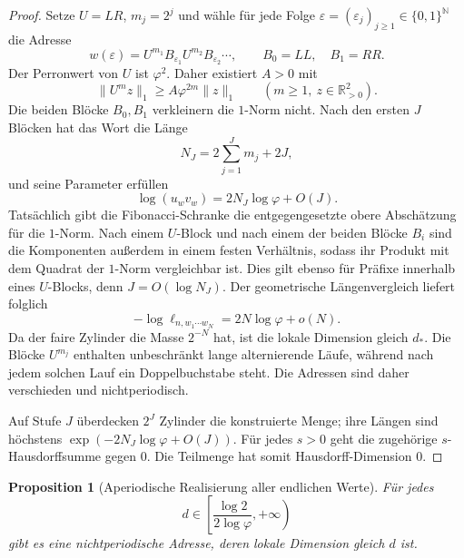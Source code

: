 \documentclass[11pt,a4paper]{article}
\newcommand{\R}{\mathbb{R}}
\newtheorem{proposition}[remark]{Proposition}
\begin{document}
\begin{proof}
Setze $U=LR$, $m_j=2^j$ und wähle für jede Folge
$\varepsilon=(\varepsilon_j)_{j\ge1}\in\{0,1\}^{\mathbb N}$ die Adresse
\[
 w(\varepsilon)=U^{m_1}B_{\varepsilon_1}
 U^{m_2}B_{\varepsilon_2}\cdots,
 \qquad B_0=LL,\quad B_1=RR.
\]
Der Perronwert von $U$ ist $\varphi^2$. Daher existiert $A>0$ mit
\[
 \|U^m z\|_1\ge A\varphi^{2m}\|z\|_1
 \qquad(m\ge1,\ z\in\R_{>0}^2).
\]
Die beiden Blöcke $B_0,B_1$ verkleinern die $1$-Norm nicht. Nach den
ersten $J$ Blöcken hat das Wort die Länge
\[
 N_J=2\sum_{j=1}^Jm_j+2J,
\]
und seine Parameter erfüllen
\[
 \log(u_{w}v_{w})=2N_J\log\varphi+O(J).
\]
Tatsächlich gibt die Fibonacci-Schranke die entgegengesetzte obere
Abschätzung für die $1$-Norm. Nach einem $U$-Block und nach einem der
beiden Blöcke $B_i$ sind die Komponenten außerdem in einem festen
Verhältnis, sodass ihr Produkt mit dem Quadrat der $1$-Norm vergleichbar
ist. Dies gilt ebenso für Präfixe innerhalb eines $U$-Blocks, denn
$J=O(\log N_J)$. Der geometrische Längenvergleich liefert folglich
\[
 -\log\ell_{n,w_1\cdots w_N}
 =2N\log\varphi+o(N).
\]
Da der faire Zylinder die Masse $2^{-N}$ hat, ist die lokale Dimension
gleich $d_*$. Die Blöcke $U^{m_j}$ enthalten unbeschränkt lange
alternierende Läufe, während nach jedem solchen Lauf ein Doppelbuchstabe
steht. Die Adressen sind daher verschieden und nichtperiodisch.

Auf Stufe $J$ überdecken $2^J$ Zylinder die konstruierte Menge; ihre
Längen sind höchstens
$\exp(-2N_J\log\varphi+O(J))$. Für jedes $s>0$ geht die zugehörige
$s$-Hausdorffsumme gegen $0$. Die Teilmenge hat somit
Hausdorff-Dimension $0$.
\end{proof}

\begin{proposition}[Aperiodische Realisierung aller endlichen Werte]
Für jedes
\[
 d\in\left[\frac{\log2}{2\log\varphi},+\infty\right)
\]
gibt es eine nichtperiodische Adresse, deren lokale Dimension gleich $d$
ist.
\end{proposition}
\end{document}
